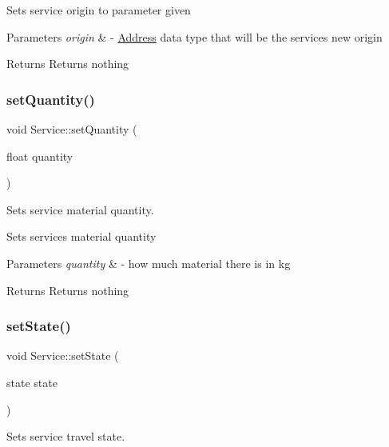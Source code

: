 Sets service origin to parameter given 
\begin{DoxyParams}{Parameters}
{\em origin} & -\/ \hyperlink{class_address}{Address} data type that will be the service\textquotesingle{}s new origin \\
\hline
\end{DoxyParams}
\begin{DoxyReturn}{Returns}
Returns nothing 
\end{DoxyReturn}
\mbox{\label{class_service_a29386f4e82e1de1f654468d4a020c6a4}} 
\subsubsection{\texorpdfstring{set\+Quantity()}{setQuantity()}}
{\footnotesize\ttfamily void Service\+::set\+Quantity (\begin{DoxyParamCaption}\item[{float}]{quantity }\end{DoxyParamCaption})}



Sets service material quantity. 

Sets service\textquotesingle{}s material quantity 
\begin{DoxyParams}{Parameters}
{\em quantity} & -\/ how much material there is in kg \\
\hline
\end{DoxyParams}
\begin{DoxyReturn}{Returns}
Returns nothing 
\end{DoxyReturn}
\mbox{\label{class_service_a7aa57d557be113ce2025843cb1046137}} 
\subsubsection{\texorpdfstring{set\+State()}{setState()}}
{\footnotesize\ttfamily void Service\+::set\+State (\begin{DoxyParamCaption}\item[{state state}]{ }\end{DoxyParamCaption})}



Sets service travel state. 

